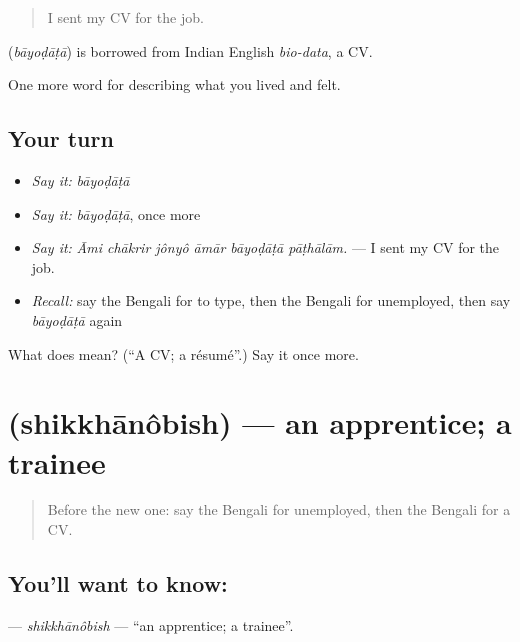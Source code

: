 \begin{quote}
I sent my CV for the job.
\end{quote}

\begin{cousinweb}
\textbf{} (\emph{bāyoḍāṭā}) is borrowed from Indian English \emph{bio-data}, a CV.
\end{cousinweb}

\begin{grammarlens}[title={What you've built}]
One more word for describing what you lived and felt.
\end{grammarlens}

\subsection*{Your turn}
\begin{itemize}
\raggedright
  \item \emph{Say it:} \emph{bāyoḍāṭā}
  \item \emph{Say it:} \emph{bāyoḍāṭā}, once more
  \item \emph{Say it:} \emph{Āmi chākrir jônyô āmār bāyoḍāṭā pāṭhālām.} — I sent my CV for the job.
  \item \emph{Recall:} say the Bengali for to type, then the Bengali for unemployed, then say \emph{bāyoḍāṭā} again
\end{itemize}

\begin{tcolorbox}[breakable,colback=teal!4,colframe=teal!35!black,title={Before you move on}]
What does  mean? (\textquotedblleft{}A CV; a résumé\textquotedblright{}.) Say it once more.
\end{tcolorbox}
\section[\texorpdfstring{\bn{শিক্ষানবিশ} (shikkhānôbish)}{শিক্ষানবিশ (shikkhānôbish)}]{ (shikkhānôbish) — an apprentice; a trainee}

\label{lesson:BN-C494-shikkhanobish}



\begin{quote}
Before the new one: say the Bengali for unemployed, then the Bengali for a CV.
\end{quote}

\subsection*{You'll want to know: }
\textbf{} — \emph{shikkhānôbish} — \textquotedblleft{}an apprentice; a trainee\textquotedblright{}.

